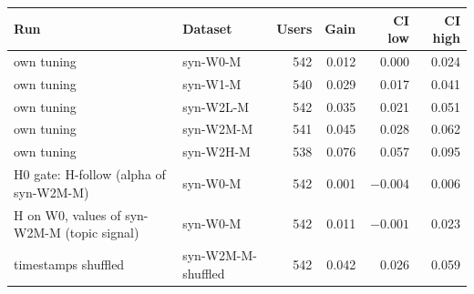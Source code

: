 \begin{tabular}{llrrrr}
\toprule
Run & Dataset & Users & Gain & CI low & CI high \\
\midrule
own tuning & syn-W0-M & 542 & 0.012 & 0.000 & 0.024 \\
own tuning & syn-W1-M & 540 & 0.029 & 0.017 & 0.041 \\
own tuning & syn-W2L-M & 542 & 0.035 & 0.021 & 0.051 \\
own tuning & syn-W2M-M & 541 & 0.045 & 0.028 & 0.062 \\
own tuning & syn-W2H-M & 538 & 0.076 & 0.057 & 0.095 \\
H0 gate: H-follow (alpha of syn-W2M-M) & syn-W0-M & 542 & 0.001 & $-0.004$ & 0.006 \\
H on W0, values of syn-W2M-M (topic signal) & syn-W0-M & 542 & 0.011 & $-0.001$ & 0.023 \\
timestamps shuffled & syn-W2M-M-shuffled & 542 & 0.042 & 0.026 & 0.059 \\
\bottomrule
\end{tabular}
